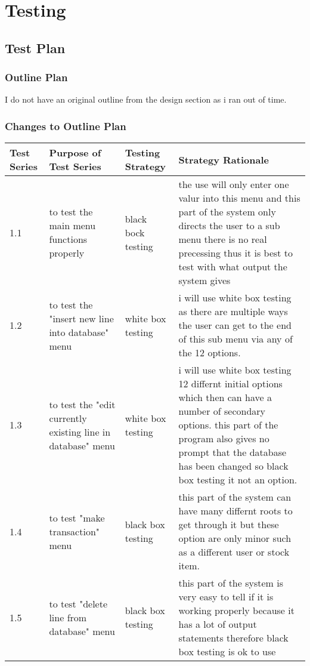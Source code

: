 \chapter{Testing}

\section{Test Plan}

\begin{landscape}

\subsection{Outline Plan}

I do not have an original outline from the design section as i ran out of time.

\subsection{Changes to Outline Plan}

\begin{center}
    \begin{tabular}{|p{2cm}|p{5cm}|p{5cm}|p{4cm}|}
        \hline
        \textbf{Test Series} & \textbf{Purpose of Test Series} & \textbf{Testing Strategy} & \textbf{Strategy Rationale}\\  \hline

        1.1 & to test the main menu functions properly  & black bock testing & the use will only enter one valur into this menu and this part of the system only directs the user to a sub menu there is no real precessing thus it is best to test with what output the system gives \\ \hline
1.2 &to test the "insert new line into database" menu & white box testing & i will use white box testing as there are multiple ways the user can get to the end of this sub menu via any of the 12 options.\\ \hline
1.3 & to test the "edit currently existing line in database" menu & white box testing & i will use white box testing 12 differnt initial options which then can have a number of secondary options. this part of the program also gives no prompt that the database has been changed so black box testing it not an option. \\ \hline
1.4 & to test "make transaction" menu & black box testing & this part of the system can have many differnt roots to get through it but these option are only minor such as a different user or stock item. \\ \hline
1.5 & to test "delete line from database" menu & black box testing & this part of the system is very easy to tell if it is working properly because it has a lot of output statements therefore black box testing is ok to use \\ \hline


\end{tabular}
\end{center}
\end{landscape}
